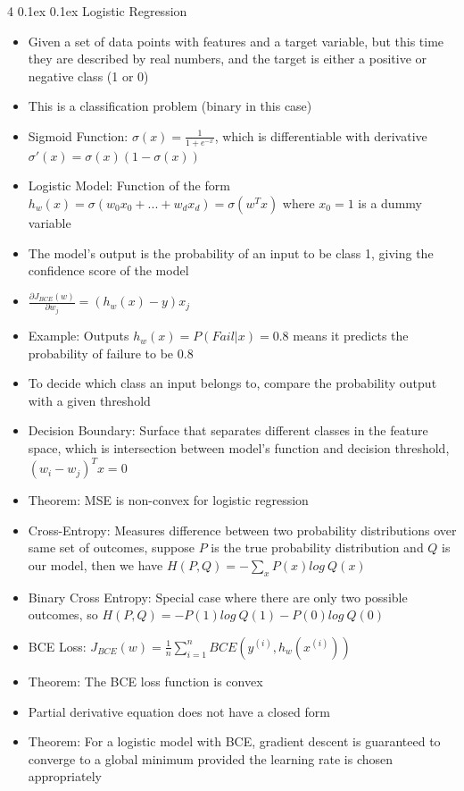 \documentclass[10pt, landscape]{article}
\makeatletter
\renewcommand{\section}{\@startsection{section}{1}{0mm}%
  {0.1ex} %
  {0.1ex} %
  {\normalfont\large\bfseries}}
\makeatother
\begin{document}
\begin{multicols*}{4}
\section{Logistic Regression}
\begin{itemize}
    \item Given a set of data points with features and a target variable, but this time they are described by real numbers, and the target is either a positive or negative class (1 or 0)
    \item This is a classification problem (binary in this case)
    \item Sigmoid Function: $\sigma(x)=\frac{1}{1+e^{-x}}$, which is differentiable with derivative $\sigma'(x)=\sigma(x)(1-\sigma(x))$
    \item Logistic Model: Function of the form $h_w(x)=\sigma(w_0x_0+...+w_dx_d)=\sigma(w^Tx)$ where $x_0=1$ is a dummy variable
    \item The model's output is the probability of an input to be class 1, giving the confidence score of the model
    \item $\frac{\partial J_{BCE}(w)}{\partial w_j}=(h_w(x)-y)x_j$
    \item Example: Outputs $h_w(x)=P(Fail | x)=0.8$ means it predicts the probability of failure to be $0.8$
    \item To decide which class an input belongs to, compare the probability output with a given threshold
    \item Decision Boundary: Surface that separates different classes in the feature space, which is intersection between model's function and decision threshold, $(w_i-w_j)^Tx=0$
    \item Theorem: MSE is non-convex for logistic regression
    \item Cross-Entropy: Measures difference between two probability distributions over same set of outcomes, suppose $P$ is the true probability distribution and $Q$ is our model, then we have $H(P,Q)=-\sum_xP(x)log\ Q(x)$
    \item Binary Cross Entropy: Special case where there are only two possible outcomes, so $H(P,Q)=-P(1)log\ Q(1) - P(0)log\ Q(0)$
    \item BCE Loss: $J_{BCE}(w)=\frac{1}{n}\sum_{i=1}^n BCE(y^{(i)}, h_w(x^{(i)}))$
    \item Theorem: The BCE loss function is convex
    \item Partial derivative equation does not have a closed form
    \item Theorem: For a logistic model with BCE, gradient descent is guaranteed to converge to a global minimum provided the learning rate is chosen appropriately

\end{itemize}
\end{multicols*}
\end{document}
